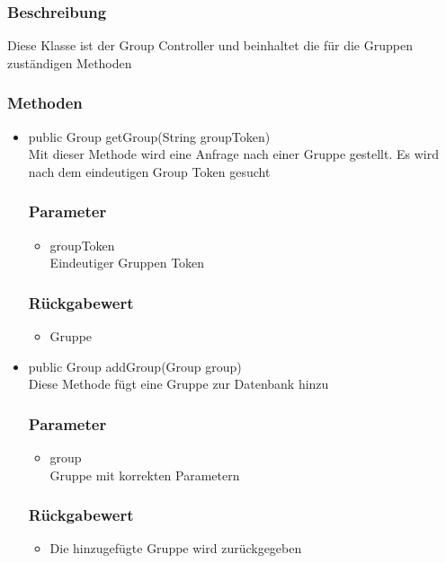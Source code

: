 \documentclass[a4paper]{scrreprt}
\begin{document}
\subsubsection*{Beschreibung}
Diese Klasse ist der Group Controller und beinhaltet die für die Gruppen zuständigen Methoden

\subsubsection*{Methoden}
\begin{addmargin}[25pt]{0pt}
\begin{itemize}

\item public Group getGroup(String groupToken)\\
	Mit dieser Methode wird eine Anfrage nach einer Gruppe gestellt. Es wird nach dem eindeutigen Group Token gesucht
	\subsubsection*{Parameter}
	\begin{itemize}
	\item groupToken \\
		Eindeutiger Gruppen Token
	\end{itemize}
	\subsubsection*{Rückgabewert}
	\begin{itemize}
	\item Gruppe 
	\end{itemize}
	
\item public Group addGroup(Group group)\\
	Diese Methode fügt eine Gruppe zur Datenbank hinzu
	\subsubsection*{Parameter}
	\begin{itemize}
	\item group \\
		Gruppe mit korrekten Parametern
	\end{itemize}
	\subsubsection*{Rückgabewert}
	\begin{itemize}
	\item Die hinzugefügte Gruppe wird zurückgegeben
	\end{itemize}
	

\end{itemize}
\end{addmargin}
\end{document}
